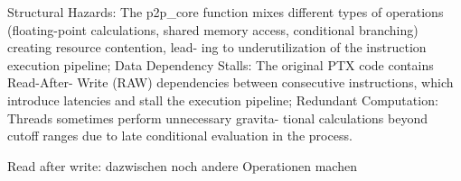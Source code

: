 Structural Hazards: The p2p_core function mixes different
types of operations (floating-point calculations, shared memory
access, conditional branching) creating resource contention, lead-
ing to underutilization of the instruction execution pipeline; Data
Dependency Stalls: The original PTX code contains Read-After-
Write (RAW) dependencies between consecutive instructions, which
introduce latencies and stall the execution pipeline; Redundant
Computation: Threads sometimes perform unnecessary gravita-
tional calculations beyond cutoff ranges due to late conditional
evaluation in the process.



Read after write: dazwischen noch andere Operationen machen
